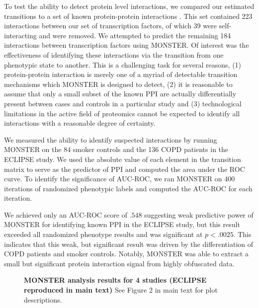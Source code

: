\documentclass[english]{article}
\begin{document}
To test the ability to detect protein level interactions, we compared
our estimated transitions to a set of known protein-protein interactions
\cite{ravasi2010atlas}. This set contained 223 interactions between
our set of transcription factors, of which 39 were self-interacting
and were removed. We attempted to predict the remaining 184 interactions
between transcription factors using MONSTER. Of interest was the effectiveness
of identifying these interactions via the transition from one phenotypic
state to another. This is a challenging task for several reasons,
(1) protein-protein interaction is merely one of a myriad of detectable
transition mechanisms which MONSTER is designed to detect, (2) it
is reasonable to assume that only a small subset of the known PPI
are actually differentially present between cases and controls in
a particular study and (3) technological limitations in the active
field of proteomics cannot be expected to identify all interactions
with a reasonable degree of certainty.

We measured the ability to identify suspected interactions by running
MONSTER on the 84 smoker controls and the 136 COPD patients in the
ECLIPSE study. We used the absolute value of each element in the transition
matrix to serve as the predictor of PPI and computed the area under
the ROC curve. To identify the significance of AUC-ROC, we ran MONSTER
on 400 iterations of randomized phenotypic labels and computed the
AUC-ROC for each iteration. 

We achieved only an AUC-ROC score of $.548$ suggesting weak predictive
power of MONSTER for identifying known PPI in the ECLIPSE study, but
this result exceeded all randomized phenotype results and was significant
at $p<.0025$. This indicates that this weak, but significant result
was driven by the differentiation of COPD patients and smoker controls.
Notably, MONSTER was able to extract a small but significant protein
interaction signal from highly obfuscated data.

\begin{figure}


\begin{raggedright}
\textbf{}
\par\end{raggedright}

\begin{raggedright}
\textbf{}
\par\end{raggedright}

\caption{\textbf{MONSTER analysis results for 4 studies (ECLIPSE reproduced
in main text) }See Figure 2 in main text for plot descriptions.}
\end{figure}
\end{document}
